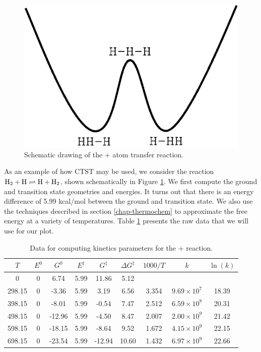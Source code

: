 \begin{figure}
\begin{center}
\includegraphics[scale=0.5]{h3-isom.eps}
\end{center}
\caption{Schematic drawing of the + atom transfer reaction.}
\label{h3-isom}
\end{figure}

As an example of how CTST may be used, we consider the reaction
$\mathrm{H_2}+\mathrm{H}\rightleftharpoons\mathrm{H}+\mathrm{H_2}$, shown
schematically in Figure \ref{h3-isom}. We first compute the ground and
transition state geometries and energies. It turns out that there is
an energy difference of 5.99 kcal/mol between the ground and
transition state. We also use the techniques described in section
\ref{chap-thermochem} to approximate the free energy at a variety of
temperatures. Table
\ref{h3-data-table} presents the raw data that we will use for our
plot.

\begin{table}
\caption{Data for computing kinetics parameters for the
+ reaction.}
\label{h3-data-table}
\begin{center}
\begin{tabular}{ccccccccc}\\ \hline\hline
$T$ & $E^0$ & $G^0$ & $E^\ddag$ & 
 $G^\ddag$ & $\Delta G^\ddag$& $1000/T$ & $k$ & $\ln(k)$ \\ \hline
0      & 0 & 6.74   & 5.99 & 11.86  & 5.12 \\ 
298.15 & 0 & -3.36  & 5.99 &  3.19  & 6.56  & 3.354 &
 $9.69\times 10^7$ & 18.39    \\ 
398.15 & 0 & -8.01  & 5.99 & -0.54  & 7.47  & 2.512 &
 $6.59\times 10^8$ & 20.31    \\ 
498.15 & 0 & -12.96 & 5.99 & -4.50  & 8.47  & 2.007 &
 $2.00\times 10^9$ & 21.42    \\ 
598.15 & 0 & -18.15 & 5.99 & -8.64  & 9.52  & 1.672 &
 $4.15\times 10^9$ & 22.15    \\ 
698.15 & 0 & -23.54 & 5.99 & -12.94 & 10.60 & 1.432 &
 $6.97\times 10^9$ & 22.66    \\ 
\hline\hline
\end{tabular}
\end{center}
\end{table}


